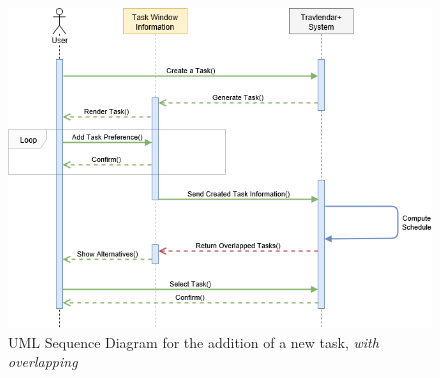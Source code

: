 \begin{figure}[H]
\centering
\includegraphics[scale=0.5]{Pictures/SequenceDiagram/adding_a_task_with_overlapping.png}
\caption{UML Sequence Diagram for the addition of a new task, \emph{with overlapping}}
\end{figure}
